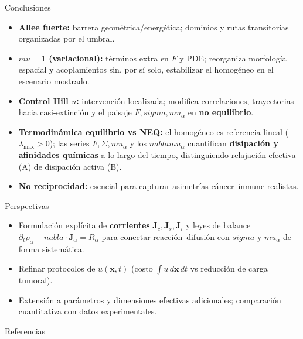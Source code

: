 \documentclass[10pt,aspectratio=169]{beamer}
\def\mu{mu}%
\def\sigma{sigma}%
\def\nabla{nabla}%
\begin{document}
\begin{frame}{Conclusiones}
  \begin{itemize}\justifying
    \item \textbf{Allee fuerte:} barrera geométrica/energética; dominios y rutas transitorias organizadas por el umbral.
    \item \textbf{\(\mu=1\) (variacional):} términos extra en \(F\) y PDE; reorganiza morfología espacial y acoplamientos sin, por sí solo, estabilizar el homogéneo en el escenario mostrado.
    \item \textbf{Control Hill \(u\):} intervención localizada; modifica correlaciones, trayectorias hacia casi-extinción y el paisaje \(F,\sigma,\mu_\alpha\) en \textbf{no equilibrio}.
    \item \textbf{Termodinámica equilibrio vs NEQ:} el homogéneo es referencia lineal (\(\lambda_{\max}>0\)); las series \(F,\Sigma,\mu_\alpha\) y los \(\nabla\mu_\alpha\) cuantifican \textbf{disipación y afinidades químicas} a lo largo del tiempo, distinguiendo relajación efectiva (A) de disipación activa (B).
    \item \textbf{No reciprocidad:} esencial para capturar asimetrías cáncer--inmune realistas.
  \end{itemize}
\end{frame}

\begin{frame}{Perspectivas}
  \begin{itemize}\justifying
    \item Formulación explícita de \textbf{corrientes} \(\mathbf{J}_c,\mathbf{J}_s,\mathbf{J}_i\) y leyes de balance \(\partial_t \rho_\alpha+\nabla\cdot\mathbf{J}_\alpha=R_\alpha\) para conectar reacción--difusión con \(\sigma\) y \(\mu_\alpha\) de forma sistemática.
    \item Refinar protocolos de \(u(\mathbf{x},t)\) (costo \(\int u\,d\mathbf{x}\,dt\) vs reducción de carga tumoral).
    \item Extensión a parámetros y dimensiones efectivas adicionales; comparación cuantitativa con datos experimentales.
  \end{itemize}
\end{frame}

\begin{frame}[allowframebreaks]{Referencias}
  \printbibliography[heading=none]
\end{frame}
\end{document}
